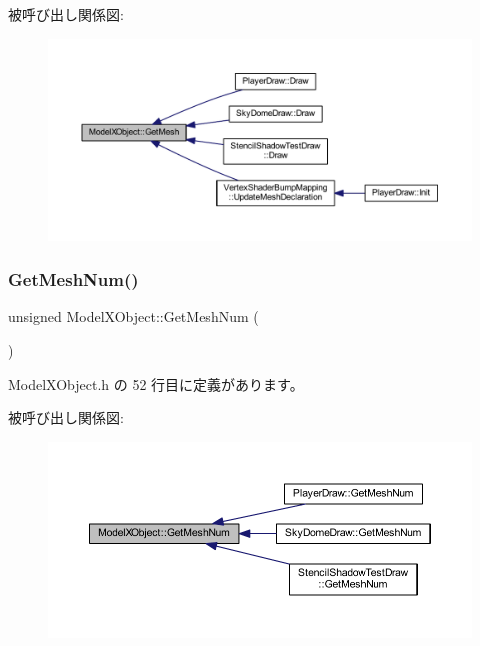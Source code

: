 被呼び出し関係図\+:\nopagebreak
\begin{figure}[H]
\begin{center}
\leavevmode
\includegraphics[width=350pt]{class_model_x_object_a3aaab083fe6e1956b2eaab815ebb4bfb_icgraph}
\end{center}
\end{figure}
\mbox{\label{class_model_x_object_a8e91c6bda6b00055bae0707037d81d9f}} 
\subsubsection{\texorpdfstring{Get\+Mesh\+Num()}{GetMeshNum()}}
{\footnotesize\ttfamily unsigned Model\+X\+Object\+::\+Get\+Mesh\+Num (\begin{DoxyParamCaption}{ }\end{DoxyParamCaption})\hspace{0.3cm}{\ttfamily [inline]}}



 Model\+X\+Object.\+h の 52 行目に定義があります。

被呼び出し関係図\+:\nopagebreak
\begin{figure}[H]
\begin{center}
\leavevmode
\includegraphics[width=350pt]{class_model_x_object_a8e91c6bda6b00055bae0707037d81d9f_icgraph}
\end{center}
\end{figure}
\mbox{\label{class_model_x_object_a612ecc2cb9b19ae1674dcc5ee8aab710}} 
